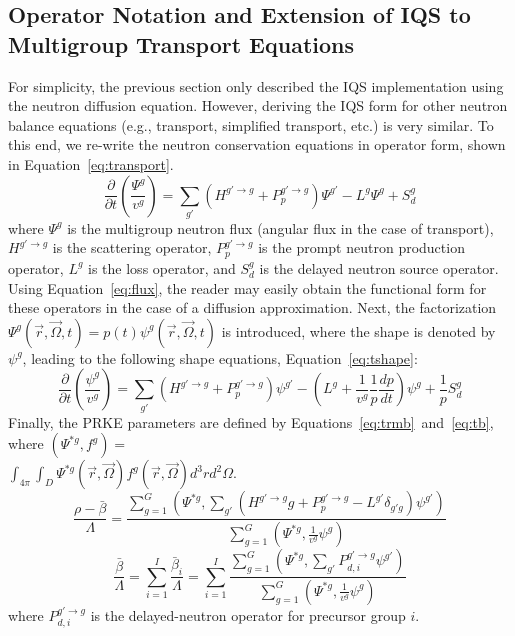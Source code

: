 \documentclass[12pt]{scrartcl}
\newcommand{\eqt}[1]{Equation~\ref{#1}}                     %
\newcommand{\be}{\begin{equation}}
\newcommand{\ee}{\end{equation}}
\begin{document}
\subsection{Operator Notation and Extension of IQS to Multigroup Transport Equations}
\label{sect:transport}

For simplicity, the previous section only described the IQS implementation using the neutron diffusion equation. However, deriving the IQS form for other neutron balance equations (e.g., transport, simplified transport, etc.) is very similar. To this end, we re-write the neutron conservation equations in operator form, shown in \eqt{eq:transport}. 
\be
\frac{\partial}{\partial t}\left(\frac{\Psi^g}{v^g}\right) = \sum_{g'} \left(H^{g'\to g} + P_p^{g' \to g} \right) \Psi^{g'} - L^g\Psi^g + S_d^g
\label{eq:transport}
\ee
where $\Psi^g$ is the multigroup neutron flux (angular flux in the case of transport), $H^{g'\to g}$ is the scattering operator, $P_p^{g' \to g}$ is the prompt neutron production operator, $L^g$ is the loss operator, and $S_d^g$ is the delayed neutron source operator. Using \eqt{eq:flux}, the reader may easily obtain the functional form for these operators in the case of a diffusion approximation.
%
Next, the factorization $\Psi^g(\vec{r},\vec{\Omega},t)=p(t)\psi^g(\vec{r},\vec{\Omega},t)$ is introduced, where the shape is denoted by $\psi^g$, leading to the following shape equations, \eqt{eq:tshape}:
\be
\frac{\partial}{\partial t}\left(\frac{\psi^g}{v^g}\right) = \sum_{g'} \left(H^{g' \to g} + P_p^{g' \to g}\right) \psi^{g'} - \left( L^g + \frac{1}{v^g}\frac{1}{p}\frac{dp}{dt}\right) \psi^g + \frac{1}{p} S_d^g
\label{eq:tshape}
\ee
Finally, the PRKE parameters are defined by Equations~\ref{eq:trmb}~and~\ref{eq:tb}, where 
$\left(\Psi^{*g},f^g\right) =$\\ $ \int_{4\pi}\int_D \Psi^{*g}(\vec{r},\vec{\Omega})f^g(\vec{r},\vec{\Omega})d^3r d^2\Omega$.
\be
\frac{\rho-\bar{\beta}}{\Lambda}=\frac{ \sum_{g=1}^G\left(\Psi^{*g},\sum_{g'}(H^{g' \to g}g+P_p^{g' \to g}-L^{g'}\delta_{g'g})\psi^{g'}\right)}{\sum_{g=1}^G\left(\Psi^{*g},\frac{1}{v^g}\psi^g\right)}
\label{eq:trmb}
\ee
\be
\frac{\bar{\beta}}{\Lambda}=\sum_{i=1}^I\frac{\bar{\beta}_i}{\Lambda}=\sum_{i=1}^I\frac{\sum_{g=1}^G(\Psi^{*g}, \sum_{g'} P_{d,i}^{g' \to g} \psi^{g'})}{\sum_{g=1}^G\left(\Psi^{*g},\frac{1}{v^g}\psi^g\right)}
\label{eq:tb}
\ee
where $P_{d,i}^{g' \to g}$ is the delayed-neutron operator for precursor group $i$.
\end{document}
